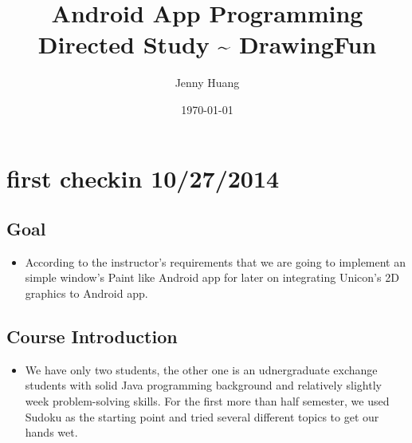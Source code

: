 \documentclass[9pt,b5paper]{article}
\author{Jenny Huang}
\date{\today}
\title{Android App Programming Directed Study \textasciitilde{} DrawingFun}
\begin{document}
\maketitle
\tableofcontents


\section{first checkin 10/27/2014}
\label{sec-1}
\subsection{Goal}
\label{sec-1-1}
\begin{itemize}
\item According to the instructor's requirements that we are going to implement an simple window's Paint like Android app for later on integrating Unicon's 2D graphics to Android app.
\end{itemize}
\subsection{Course Introduction}
\label{sec-1-2}
\begin{itemize}
\item We have only two students, the other one is an udnergraduate exchange students with solid Java programming background and relatively slightly week problem-solving skills. For the first more than half semester, we used Sudoku as the starting point and tried several different topics to get our hands wet.
\end{itemize}
\end{document}
